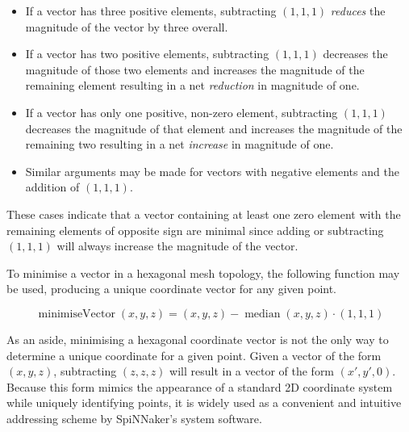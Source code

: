 	\begin{itemize}
	
		\item If a vector has three positive elements, subtracting $(1,1,1)$
		\emph{reduces} the magnitude of the vector by three overall.
		
		\item If a vector has two positive elements, subtracting $(1,1,1)$
		decreases the magnitude of those two elements and increases the magnitude
		of the remaining element resulting in a net \emph{reduction} in magnitude
		of one.
		
		\item If a vector has only one positive, non-zero element, subtracting
		$(1,1,1)$ decreases the magnitude of that element and increases the
		magnitude of the remaining two resulting in a net \emph{increase} in
		magnitude of one.
		
		\item Similar arguments may be made for vectors with negative elements and
		the addition of $(1,1,1)$.
	
	\end{itemize}
	
	These cases indicate that a vector containing at least one zero element with
	the remaining elements of opposite sign are minimal since adding or
	subtracting $(1,1,1)$ will always increase the magnitude of the vector.
	
	To minimise a vector in a hexagonal mesh topology, the following function may
	be used, producing a unique coordinate vector for any given point.
	
	\begin{equation*}
		\operatorname{minimiseVector}(x,y,z) =
			(x,y,z) - \operatorname{median}(x,y,z) \cdot (1,1,1)
	\end{equation*}
	
	As an aside, minimising a hexagonal coordinate vector is not the only way to
	determine a unique coordinate for a given point. Given a vector of the form
	$(x, y, z)$, subtracting $(z,z,z)$ will result in a vector of the form $(x',
	y', 0)$. Because this form mimics the appearance of a standard 2D coordinate
	system while uniquely identifying points, it is widely used as a convenient
	and intuitive addressing scheme by SpiNNaker's system software.
